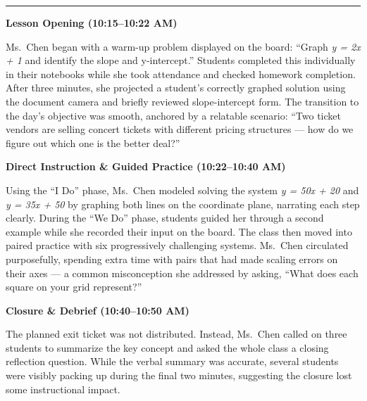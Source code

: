 \documentclass[11pt,a4paper]{article}
\newcommand{\sectionheader}[1]{%
  \vspace{14pt}
  \noindent{\Large\textcolor{primary}{\textbf{#1}}}\par
  \vspace{2pt}
  \noindent\textcolor{accent}{\rule{\textwidth}{1.2pt}}\par
  \vspace{8pt}
}
\begin{document}
\noindent{\footnotesize\textcolor{darkgray}{Rating Scale: 1 = Unsatisfactory\quad 2 = Needs Improvement\quad 3 = Developing\quad 4 = Proficient\quad 5 = Exemplary}}

\vspace{10pt}

\sectionheader{Narrative Observation Notes}

\begin{tcolorbox}[colback=white,colframe=borderlight,boxrule=0.5pt,arc=3pt,left=14pt,right=14pt,top=12pt,bottom=12pt]
\textcolor{primary}{\textbf{Lesson Opening (10:15--10:22 AM)}}

Ms.\ Chen began with a warm-up problem displayed on the board: \textquotedblleft{}Graph \textit{y = 2x + 1} and identify the slope and y-intercept.\textquotedblright{} Students completed this individually in their notebooks while she took attendance and checked homework completion. After three minutes, she projected a student's correctly graphed solution using the document camera and briefly reviewed slope-intercept form. The transition to the day's objective was smooth, anchored by a relatable scenario: \textquotedblleft{}Two ticket vendors are selling concert tickets with different pricing structures --- how do we figure out which one is the better deal?\textquotedblright{}

\vspace{8pt}
\textcolor{primary}{\textbf{Direct Instruction \& Guided Practice (10:22--10:40 AM)}}

Using the \textquotedblleft{}I Do\textquotedblright{} phase, Ms.\ Chen modeled solving the system \textit{y = 50x + 20} and \textit{y = 35x + 50} by graphing both lines on the coordinate plane, narrating each step clearly. During the \textquotedblleft{}We Do\textquotedblright{} phase, students guided her through a second example while she recorded their input on the board. The class then moved into paired practice with six progressively challenging systems. Ms.\ Chen circulated purposefully, spending extra time with pairs that had made scaling errors on their axes --- a common misconception she addressed by asking, \textquotedblleft{}What does each square on your grid represent?\textquotedblright{}

\vspace{8pt}
\textcolor{primary}{\textbf{Closure \& Debrief (10:40--10:50 AM)}}

The planned exit ticket was not distributed. Instead, Ms.\ Chen called on three students to summarize the key concept and asked the whole class a closing reflection question. While the verbal summary was accurate, several students were visibly packing up during the final two minutes, suggesting the closure lost some instructional impact.
\end{tcolorbox}
\end{document}
